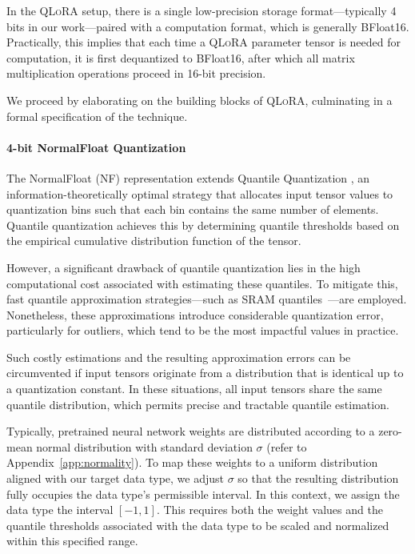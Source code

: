 In the \textsc{QLoRA} setup, there is a single low-precision storage format—typically 4 bits in our work—paired with a computation format, which is generally BFloat16. Practically, this implies that each time a \textsc{QLoRA} parameter tensor is needed for computation, it is first dequantized to BFloat16, after which all matrix multiplication operations proceed in 16-bit precision.

We proceed by elaborating on the building blocks of \textsc{QLoRA}, culminating in a formal specification of the technique.

\paragraph{4-bit NormalFloat Quantization} The NormalFloat (NF) representation extends Quantile Quantization \citep{dettmers2022optimizers}, an information-theoretically optimal strategy that allocates input tensor values to quantization bins such that each bin contains the same number of elements. Quantile quantization achieves this by determining quantile thresholds based on the empirical cumulative distribution function of the tensor.

However, a significant drawback of quantile quantization lies in the high computational cost associated with estimating these quantiles. To mitigate this, fast quantile approximation strategies—such as SRAM quantiles~\citep{dettmers2022optimizers}—are employed. Nonetheless, these approximations introduce considerable quantization error, particularly for outliers, which tend to be the most impactful values in practice.

Such costly estimations and the resulting approximation errors can be circumvented if input tensors originate from a distribution that is identical up to a quantization constant. In these situations, all input tensors share the same quantile distribution, which permits precise and tractable quantile estimation.

Typically, pretrained neural network weights are distributed according to a zero-mean normal distribution with standard deviation $\sigma$ (refer to Appendix~\ref{app:normality}). To map these weights to a uniform distribution aligned with our target data type, we adjust $\sigma$ so that the resulting distribution fully occupies the data type’s permissible interval. In this context, we assign the data type the interval $[-1, 1]$. This requires both the weight values and the quantile thresholds associated with the data type to be scaled and normalized within this specified range.


